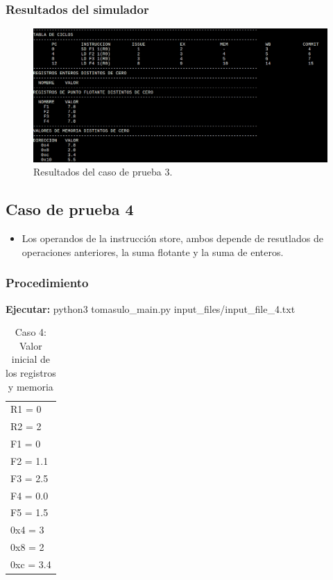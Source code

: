 \documentclass[a4paper]{article}
\begin{document}
	\subsubsection*{Resultados del simulador}

	\begin{figure}[H]
	\centering
	\includegraphics[width=1\textwidth]{figures/test3.png}
	\caption{\label{fig:bloques}Resultados del caso de prueba 3.}
	\end{figure}


	\subsection*{Caso de prueba 4}

	\begin{itemize}
		\item Los operandos de la instrucción store, ambos depende de resutlados de operaciones anteriores, la suma flotante y la suma de enteros. 
	\end{itemize}

	\subsubsection*{Procedimiento}

	\textbf{Ejecutar:} python3 tomasulo\_main.py input\_files/input\_file\_4.txt

	\begin{table}[H]
		\centering
		\caption*{Caso 4: Valor inicial de los registros y memoria}
		\begin{tabular}{l}
			R1 = 0 \\
			R2 = 2 \\
			F1 = 0  \\
			F2 = 1.1 \\
			F3 = 2.5 \\
			F4 = 0.0 \\
			F5 = 1.5 \\
			0x4 = 3 \\
			0x8 = 2 \\
			0xc = 3.4 \\
		\end{tabular}
	\end{table}
\end{document}

